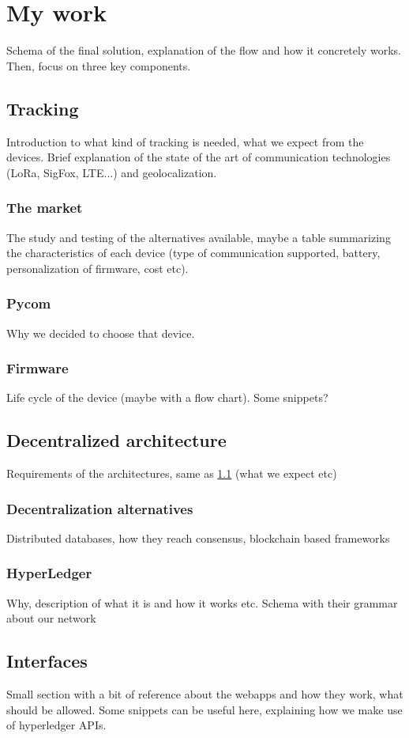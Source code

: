 \chapter{My work}
\label{cha:main}
Schema of the final solution, explanation of the flow and how it concretely works. Then, focus on three key components.

\section{Tracking}
\label{sec:tracking}
Introduction to what kind of tracking is needed, what we expect from the devices. Brief explanation of the state of the art of communication technologies (LoRa, SigFox, LTE...) and geolocalization.

\subsection{The market}
\label{sec:track_market}
The study and testing of the alternatives available, maybe a table summarizing the characteristics of each device (type of communication supported, battery, personalization of firmware, cost etc).

\subsection{Pycom}
\label{sec:track_choice}
Why we decided to choose that device.

\subsection{Firmware}
\label{sec:track_firmware}
Life cycle of the device (maybe with a flow chart). Some snippets?

\section{Decentralized architecture}
Requirements of the architectures, same as \ref{sec:tracking} (what we expect etc)

\subsection{Decentralization alternatives}
Distributed databases, how they reach consensus, blockchain based frameworks

\subsection{HyperLedger}
Why, description of what it is and how it works etc. Schema with their grammar about our network


\section{Interfaces}
Small section with a bit of reference about the webapps and how they work, what should be allowed. Some snippets can be useful here, explaining how we make use of hyperledger APIs.


